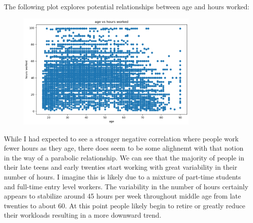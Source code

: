 \documentclass{article}
\begin{document}
    \begin{center}
        \begin{minipage}[t]{0.9\textwidth}
            The following plot explores potential relationships between age and hours worked:
            \begin{figure}[H]
                \centering
                \includegraphics[width=0.8\textwidth, height=0.3\textheight]{./1_5a.png}
            \end{figure}
            While I had expected to see a stronger negative correlation where people
            work fewer hours as they age, there does seem to be some alighnemt with
            that notion in the way of a parabolic relationship.
            We can see that the majority of people in their late teens and early twenties
            start working with great variability in their number of hours. I imagine
            this is likely due to a mixture of part-time students and full-time entry
            level workers. The variability in the number of hours certainly appears to
            stabilize around 45 hours per week throughout middle age from late twenties
            to about 60. At this point people likely begin to retire or greatly reduce
            their workloads resulting in a more downward trend.
        \end{minipage}
    \end{center}

    \newpage
\end{document}
